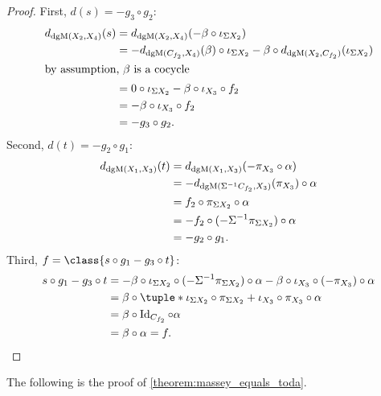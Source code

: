 \begin{proof}
    First, \( d(s) = -g_3 \circ g_2 \):
    \begin{align*}
        d_{\operatorname{dgM}(X_2, X_4)}(s) &= d_{\operatorname{dgM}(X_2, X_4)}(- \beta \circ \iota_{\Sigma X_2}) \\
        &= - d_{\operatorname{dgM}(C_{f_2}, X_4)}(\beta) \circ \iota_{\Sigma X_2} - \beta \circ d_{\operatorname{dgM}(X_2, C_{f_2})}(\iota_{\Sigma X_2}) \\
        \intertext{by assumption, \( \beta \) is a cocycle}
        &= 0 \circ \iota_{\Sigma X_2} - \beta \circ \iota_{X_3} \circ f_2 \\
        &= - \beta \circ \iota_{X_3} \circ f_2 \\
        &= - g_3 \circ g_2.
    \end{align*}
    Second, \( d(t) = - g_2 \circ g_1 \):
    \begin{align*}
         d_{\operatorname{dgM}(X_1, X_3)}(t) &= d_{\operatorname{dgM}(X_1, X_3)}(- \pi_{X_3} \circ \alpha) \\
         &= -d_{\operatorname{dgM}(\Sigma^{-1} C_{f_2}, X_3)}(\pi_{X_3}) \circ \alpha \\
         &= f_2 \circ \pi_{\Sigma X_2} \circ \alpha \\
         &= - f_2 \circ (- \Sigma^{-1} \pi_{\Sigma X_2}) \circ \alpha \\
         &= - g_2 \circ g_1.
    \end{align*}
    Third, \( f = \class{s \circ g_1 - g_3 \circ t} \):
    \begin{align*}
        s \circ g_1 - g_3 \circ t &= - \beta \circ \iota_{\Sigma X_2} \circ (-\Sigma^{-1} \pi_{\Sigma X_2}) \circ \alpha - \beta \circ \iota_{X_3} \circ (- \pi_{X_3}) \circ \alpha \\
        &= \beta \circ \tuple*{\iota_{\Sigma X_2} \circ \pi_{\Sigma X_2} + \iota_{X_3} \circ \pi_{X_3}} \circ \alpha \\
        &= \beta \circ \Id_{C_{f_2}} \circ \alpha \\
        &= \beta \circ \alpha = f.
    \end{align*}
\end{proof}

The following is the proof of \autoref{theorem:massey_equals_toda}.

